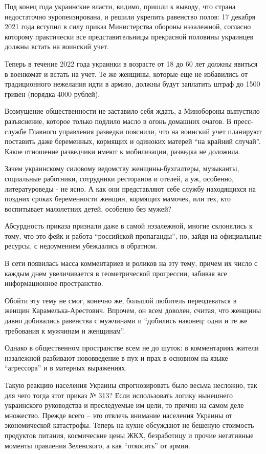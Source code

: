 Под конец года украинские власти, видимо, пришли к выводу, что страна
недостаточно эуропеизирована, и решили укрепить равенство полов: 17 декабря
2021 года вступил в силу приказ Министерства обороны нэзалежной, согласно
которому практически все представительницы прекрасной половины украинцев должны
встать на воинский учет.

Теперь в течение 2022 года украинки в возрасте от 18 до 60 лет должны явиться в
военкомат и встать на учет. Те же женщины, которые еще не избавились от
традиционного нежелания идти в армию, должны будут заплатить штраф до 1500
гривен (порядка 4000 рублей). 

Возмущение общественности не заставило себя ждать, а Минобороны выпустило
разъяснение, которое только подлило масло в огонь домашних очагов. В
пресс-службе Главного управления разведки пояснили, что на воинский учет
планируют поставить даже беременных, кормящих и одиноких матерей \enquote{на крайний
случай}. Какое отношение разведчики имеют к мобилизации, разведка не доложила.

Зачем украинскому силовому ведомству женщины-бухгалтеры, музыканты, социальные
работники, сотрудники ресторанов и отелей, а уж, особенно, литературоведы - не
ясно. А как они представляют себе службу находящихся на поздних сроках
беременности женщин, кормящих мамочек, или тех, кто воспитывает малолетних
детей, особенно без мужей?

Абсурдность приказа признали даже в самой нэзалежной, многие склонялись к тому,
что это фейк и работа \enquote{российской пропаганды}, но, зайдя на официальные
ресурсы, с недоумением убеждались в обратном.

В сети появилась масса комментариев и роликов на эту тему, причем их число с
каждым днем увеличивается в геометрической прогрессии, забивая все
информационное пространство. 

Обойти эту тему не смог, конечно же, большой любитель переодеваться в женщин
Карамелька-Арестович. Впрочем, он всем доволен, считая, что женщины давно
добивались равенства с мужчинами и \enquote{добились наконец: одни и те же требования к
мужчинам и женщинам}.

Однако в общественном пространстве всем не до шуток: в комментариях жители
нэзалежной разбивают нововведение в пух и прах в основном на языке
\enquote{агрессора} и в матерных выражениях. 

Такую реакцию населения Украины спрогнозировать было весьма несложно, так для
чего тогда этот приказ № 313? Если использовать логику нынешнего украинского
руководства и преследуемые им цели, то причин на самом деле множество. Прежде
всего – это отвлечь внимание населения Украины от экономической катастрофы.
Теперь на кухне обсуждают не бешеную стоимость продуктов питания, космические
цены ЖКХ, безработицу и прочие негативные моменты правления Зеленского, а как
\enquote{откосить} от армии. 

